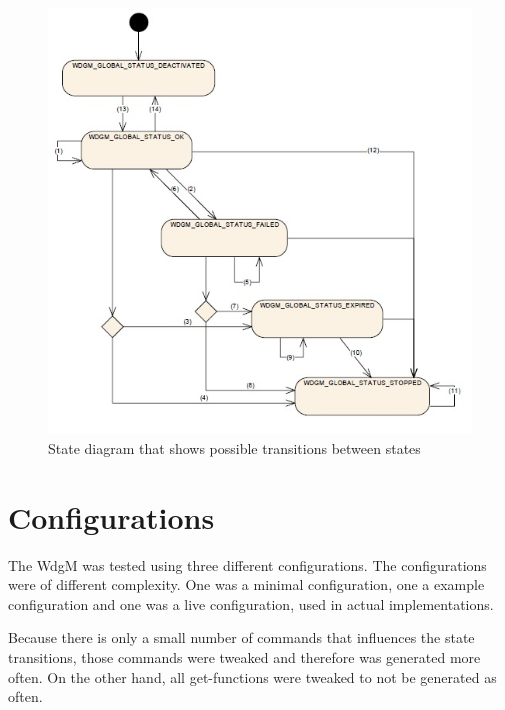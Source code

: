 \begin{figure}[h!]
  \begin{center}
    \includegraphics{pictures/globalstatuses.jpg}
  \end{center}
  \caption{State diagram that shows possible transitions between states}
  \label{FIG:GLOBALSTATUSES}
\end{figure}

\section{Configurations}
The WdgM was tested using three different configurations. The configurations
were of different complexity. One was a minimal configuration, one a example
configuration and one was a live configuration, used in actual implementations.

Because there is only a small number of commands that influences the state
transitions, those commands were tweaked and therefore was generated more
often. On the other hand, all get-functions were tweaked to not be generated as often.

